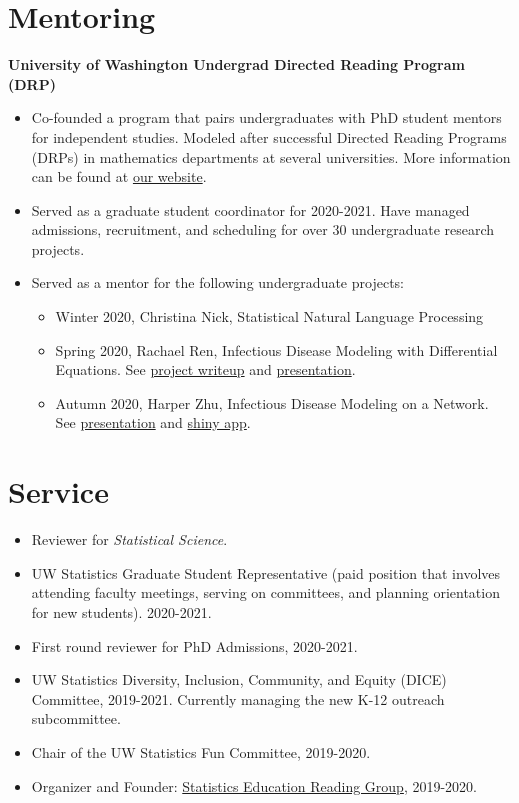 \documentclass[margin, 10pt]{res} %
\begin{document}
\begin{resume}
{\section{Mentoring}
{\textbf{University of Washington Undergrad Directed Reading Program (DRP)}}
\begin{itemize}
  \item Co-founded a program that pairs undergraduates with PhD student mentors for independent studies. Modeled after successful Directed Reading Programs (DRPs) in mathematics departments at several universities. More information can be found at \href{https://spa-drp.github.io}{our website}. 
  \item Served as a graduate student coordinator for 2020-2021. Have managed admissions, recruitment, and scheduling for over 30 undergraduate research projects. 
  \item Served as a mentor for the following undergraduate projects:
  \begin{itemize}
  \item Winter 2020, Christina Nick, Statistical Natural Language Processing
  \item Spring 2020, Rachael Ren, Infectious Disease Modeling with Differential Equations. See \href{https://spa-drp.github.io/writeups/spring2020/rachael.pdf}{project writeup} and \href{https://spa-drp.github.io/writeups/spring2020/rachaelslides.pdf}{presentation}.
  \item Autumn 2020, Harper Zhu, Infectious Disease Modeling on a Network.  See \href{https://spa-drp.github.io/writeups/aut2020/harper-slides.pdf}{presentation} and \href{https://harperzhu.shinyapps.io/DiseaseSimulation/}{shiny app}.
 \end{itemize}
 \end{itemize}



\section{Service}
\begin{itemize}
\item Reviewer for \textit{Statistical Science}.
 \item UW Statistics Graduate Student Representative (paid position that involves attending faculty meetings, serving on committees, and planning orientation for new students). 2020-2021.
    \item First round reviewer for PhD Admissions, 2020-2021. 
    \item UW Statistics Diversity, Inclusion, Community, and Equity (DICE) Committee, 2019-2021. Currently managing the new K-12 outreach subcommittee.
    \item Chair of the UW Statistics Fun Committee, 2019-2020.
    \item Organizer and Founder: \href{https://pearce790.github.io}{Statistics Education Reading Group}, 2019-2020.
  

\end{itemize}}
\end{resume}
\end{document}
